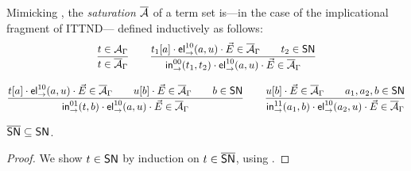 
Mimicking ,
the \emph{saturation} $\overline{\mathcal{A}}$ of a term set is---in the case of the
implicational fragment of ITTND--- defined inductively as follows:
\begin{gather*}
  \dfrac{t \in \mathcal{A}_\Gamma
    }{t \in \overline{\mathcal{A}}_\Gamma}
\qquad
  \dfrac{t_1[a] \cdot \mathsf{el}_{\to}^{10}(a,u) \cdot \vec E \in \overline{\mathcal{A}}_\Gamma
      \qquad
      t_2 \in \mathsf{SN}
    }{\mathsf{in}_{\to}^{00}(t_1,t_2) \cdot \mathsf{el}_{\to}^{10}(a,u) \cdot \vec E \in \overline{\mathcal{A}}_\Gamma}
\\[2ex]
  \dfrac{t[a] \cdot \mathsf{el}_{\to}^{10}(a,u) \cdot \vec E \in \overline{\mathcal{A}}_\Gamma
      \qquad
      u[b] \cdot \vec E \in \overline{\mathcal{A}}_\Gamma
      \qquad
      b \in \mathsf{SN}
    }{\mathsf{in}_{\to}^{01}(t,b) \cdot \mathsf{el}_{\to}^{10}(a,u) \cdot \vec E \in \overline{\mathcal{A}}_\Gamma}
\qquad
  \dfrac{u[b] \cdot \vec E \in \overline{\mathcal{A}}_\Gamma
      \qquad
      a_1,a_2,b \in \mathsf{SN}
    }{\mathsf{in}_{\to}^{11}(a_1,b) \cdot \mathsf{el}_{\to}^{10}(a_2,u) \cdot \vec E \in \overline{\mathcal{A}}_\Gamma}
\end{gather*}


\begin{lemma}
  \label{lem:sat-preserves-sn}
  $\overline{\mathsf{SN}} \subseteq \mathsf{SN}$.
\end{lemma}
\begin{proof}
  We show $t \in \mathsf{SN}$ by induction on $t \in \overline{\mathsf{SN}}$, using .
\end{proof}


